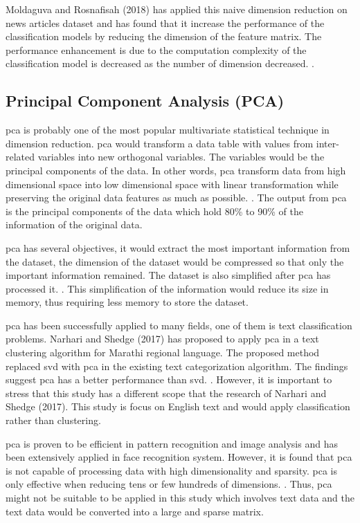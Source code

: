 Moldaguva and Rosnafisah (2018) has applied this naive dimension reduction on news articles dataset and has found that it increase the performance of the classification models by reducing the dimension of the feature matrix. The performance enhancement is due to the computation complexity of the classification model is decreased as the number of dimension decreased. \cite{knnVectorSpaceReduction}.\\


\subsection{Principal Component Analysis (PCA)}
\Ac{pca} is probably one of the most popular multivariate statistical technique in dimension reduction. \Ac{pca} would transform a data table with values from inter-related variables into new orthogonal variables. The variables would be the principal components of the data. In other words, \ac{pca} transform data from high dimensional space into low dimensional space with linear transformation while preserving the original data features as much as possible. \cite{pcaImage}. The output from \ac{pca} is the principal components of the data which hold 80\% to 90\% of the information of the original data.

\Ac{pca} has several objectives, it would extract the most important information from the dataset, the dimension of the dataset would be compressed so that only the important information remained. The dataset is also simplified after \ac{pca} has processed it. \cite{pcaObj}. This simplification of the information would reduce its size in memory, thus requiring less memory to store the dataset.

\Ac{pca} has been successfully applied to many fields, one of them is text classification problems. Narhari and Shedge (2017) has proposed to apply \ac{pca} in a text clustering algorithm for Marathi regional language. The proposed method replaced \ac{svd} with \ac{pca} in the existing text categorization algorithm. The findings suggest \ac{pca} has a better performance than \ac{svd}. \cite{marathi}. However, it is important to stress that this study has a different scope that the research of Narhari and Shedge (2017). This study is focus on English text and would apply classification rather than clustering.

\Ac{pca} is proven to be efficient in pattern recognition and image analysis and has been extensively applied in face recognition system. However, it is found that \ac{pca} is not capable of processing data with high dimensionality and sparsity. \ac{pca} is only effective when reducing tens or few hundreds of dimensions. \cite{dimRedCat}. Thus, \ac{pca} might not be suitable to be applied in this study which involves text data and the text data would be converted into a large and sparse matrix.\\

